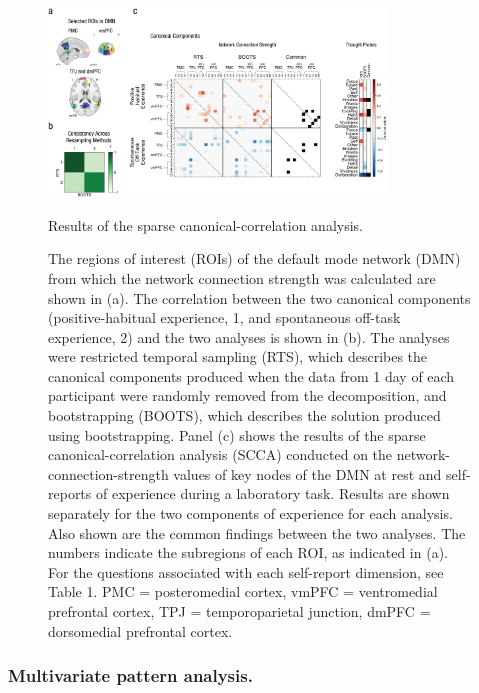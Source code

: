 \begin{figure}
	\centering
	\includegraphics[width=0.8\textwidth]{study1/image/study1fig2.jpeg}
	\caption{Results of the sparse canonical-correlation analysis.}
	\caption*{\scriptsize{The regions of interest (ROIs) of the default mode network (DMN) from which the network connection strength was calculated are shown in (a). The correlation between the two canonical components (positive-habitual experience, 1, and spontaneous off-task experience, 2) and the two analyses is shown in (b). The analyses were restricted temporal sampling (RTS), which describes the canonical components produced when the data from 1 day of each participant were randomly removed from the decomposition, and bootstrapping (BOOTS), which describes the solution produced using bootstrapping. Panel (c) shows the results of the sparse canonical-correlation analysis (SCCA) conducted on the network-connection-strength values of key nodes of the DMN at rest and self-reports of experience during a laboratory task. Results are shown separately for the two components of experience for each analysis. Also shown are the common findings between the two analyses. The numbers indicate the subregions of each ROI, as indicated in (a). For the questions associated with each self-report dimension, see Table 1. PMC = posteromedial cortex, vmPFC = ventromedial prefrontal cortex, TPJ = temporoparietal junction, dmPFC = dorsomedial prefrontal cortex.}}

	\label{fig:study1:fig2}
\end{figure}

\subsubsection{Multivariate pattern analysis.}

